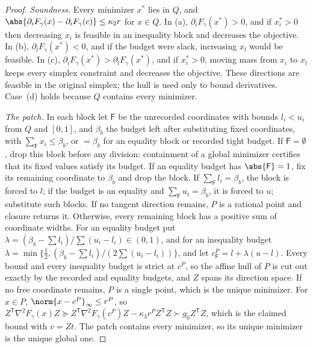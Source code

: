 \begin{proof}
\emph{Soundness.} Every minimizer $x^*$ lies in $Q$, and
$\abs{\partial_iF_\gamma(x)-\partial_iF_\gamma(c)}\le\kappa_2r$ for $x\in Q$. In
(a), $\partial_iF_\gamma(x^*)>0$, and if $x_i^*>0$ then decreasing $x_i$ is
feasible in an inequality block and decreases the objective. In (b),
$\partial_lF_\gamma(x^*)<0$, and if the budget were slack, increasing $x_l$
would be feasible. In (c), $\partial_iF_\gamma(x^*)>\partial_lF_\gamma(x^*)$,
and if $x_i^*>0$, moving mass from $x_i$ to $x_l$ keeps every simplex
constraint and decreases the objective. These directions are feasible in the
original simplex; the hull is used only to bound derivatives. Case~(d) holds
because $Q$ contains every minimizer.

\emph{The patch.} In each block let $\mathsf F$ be the unrecorded coordinates
with bounds $l_i<u_i$ from $Q$ and $[0,1]$, and $\beta_b$ the budget left
after substituting fixed coordinates, with $\sum_{\mathsf F}x_i\le\beta_b$, or
$=\beta_b$ for an equality block or recorded tight budget. If
$\mathsf F=\emptyset$, drop this block before any division: containment of
a global minimizer certifies that its fixed values satisfy its budget.
If an equality budget has $\abs{\mathsf F}=1$, fix its remaining coordinate
to $\beta_b$ and drop the block. If
$\sum_{\mathsf F}l_i=\beta_b$, the block is forced to $l$; if the budget is an
equality and $\sum_{\mathsf F}u_i=\beta_b$, it is forced to $u$; substitute
such blocks. If no tangent direction remains, $P$ is a rational point and
closure returns it. Otherwise, every remaining block has a positive sum of
coordinate widths. For an equality budget put
$\lambda=(\beta_b-\sum l_i)/\sum(u_i-l_i)\in(0,1)$, and for an inequality
budget $\lambda=\min\{\frac12,(\beta_b-\sum l_i)/(2\sum(u_i-l_i))\}$, and let
$c^P_{\mathsf F}=l+\lambda(u-l)$. Every bound and every inequality budget is
strict at $c^P$, so the affine hull of $P$ is cut out exactly by the
recorded and equality budgets, and $Z$ spans its direction space. If no free
coordinate remains, $P$ is a single point, which is the unique minimizer.
For $x\in P$, $\norm{x-c^P}_\infty\le r^P$, so
$Z^{\mathsf T}\nabla^2F_\gamma(x)Z\succeq Z^{\mathsf T}\nabla^2F_\gamma(c^P)Z
-\kappa_3r^PZ^{\mathsf T}Z\succ g_0Z^{\mathsf T}Z$, which is the claimed bound
with $v=Zt$. The patch contains every minimizer, so its unique minimizer is
the unique global one.


\end{proof}
